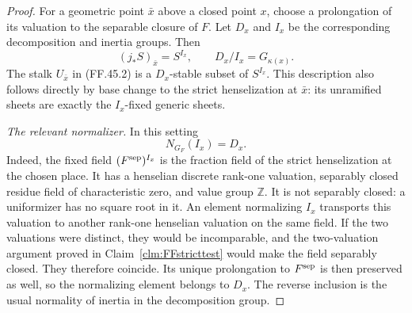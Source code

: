 \begin{proof}
For a geometric point \(\bar x\) above a closed point
\(x\), choose a prolongation of its valuation to the
separable closure of \(F\). Let \(D_x\) and \(I_x\)
be the corresponding decomposition and inertia groups.
Then
\[
               (j_*S)_{\bar x}=S^{I_x},\qquad
               D_x/I_x=G_{\kappa(x)}.
                                                        \tag{FF.45.3}
\]
The stalk \(U_{\bar x}\) in (FF.45.2) is a
\(D_x\)-stable subset of \(S^{I_x}\). This description
also follows directly by base change to the strict
henselization at \(\bar x\): its unramified sheets are
exactly the \(I_x\)-fixed generic sheets.

\emph{The relevant normalizer.}
In this setting
\[
                            N_{G_F}(I_x)=D_x.
                                                        \tag{FF.45.4}
\]
Indeed, the fixed field \((F^{\rm sep})^{I_x}\) is the
fraction field of the strict henselization at the chosen
place. It has a henselian discrete rank-one valuation,
separably closed residue field of characteristic zero,
and value group \(\mathbb Z\). It is not separably
closed: a uniformizer has no square root in it. An element
normalizing \(I_x\) transports this valuation to another
rank-one henselian valuation on the same field. If the
two valuations were distinct, they would be incomparable,
and the two-valuation argument proved in
Claim~\ref{clm:FFstricttest} would make the field separably
closed. They therefore coincide. Its unique prolongation
to \(F^{\rm sep}\) is then preserved as well, so the
normalizing element belongs to \(D_x\). The reverse
inclusion is the usual normality of inertia in the
decomposition group.


\end{proof}

